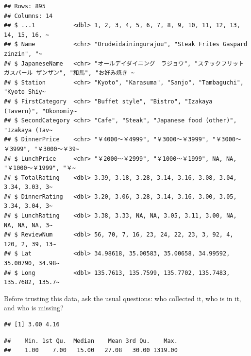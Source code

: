 \documentclass[
]{article}
\newenvironment{Shaded}{\begin{snugshade}}{\end{snugshade}}
\newcommand{\CommentTok}[1]{\textcolor[rgb]{0.56,0.35,0.01}{\textit{#1}}}
\newcommand{\FunctionTok}[1]{\textcolor[rgb]{0.13,0.29,0.53}{\textbf{#1}}}
\newcommand{\NormalTok}[1]{#1}
\newcommand{\SpecialCharTok}[1]{\textcolor[rgb]{0.81,0.36,0.00}{\textbf{#1}}}
\begin{document}
\begin{verbatim}
## Rows: 895
## Columns: 14
## $ ...1           <dbl> 1, 2, 3, 4, 5, 6, 7, 8, 9, 10, 11, 12, 13, 14, 15, 16, ~
## $ Name           <chr> "Orudeidainingurajou", "Steak Frites Gaspard zinzin", "~
## $ JapaneseName   <chr> "オールデイダイニング　ラジョウ", "ステックフリット ガスパール ザンザン", "和馬", "お好み焼き ~
## $ Station        <chr> "Kyoto", "Karasuma", "Sanjo", "Tambaguchi", "Kyoto Shiy~
## $ FirstCategory  <chr> "Buffet style", "Bistro", "Izakaya (Tavern)", "Okonomiy~
## $ SecondCategory <chr> "Cafe", "Steak", "Japanese food (other)", "Izakaya (Tav~
## $ DinnerPrice    <chr> "￥4000～￥4999", "￥3000～￥3999", "￥3000～￥3999", "￥3000～￥39~
## $ LunchPrice     <chr> "￥2000～￥2999", "￥1000～￥1999", NA, NA, "￥1000～￥1999", "￥~
## $ TotalRating    <dbl> 3.39, 3.18, 3.28, 3.14, 3.16, 3.08, 3.04, 3.34, 3.03, 3~
## $ DinnerRating   <dbl> 3.20, 3.06, 3.28, 3.14, 3.16, 3.00, 3.05, 3.34, 3.04, 3~
## $ LunchRating    <dbl> 3.38, 3.33, NA, NA, 3.05, 3.11, 3.00, NA, NA, NA, NA, 3~
## $ ReviewNum      <dbl> 56, 70, 7, 16, 23, 24, 22, 23, 3, 92, 4, 120, 2, 39, 13~
## $ Lat            <dbl> 34.98618, 35.00583, 35.00658, 34.99592, 35.00790, 34.98~
## $ Long           <dbl> 135.7613, 135.7599, 135.7702, 135.7483, 135.7682, 135.7~
\end{verbatim}

Before trusting this data, ask the usual questions: who collected it,
who is in it, and who is missing?

\begin{Shaded}
\end{Shaded}

\begin{verbatim}
## [1] 3.00 4.16
\end{verbatim}

\begin{Shaded}
\end{Shaded}

\begin{verbatim}
##    Min. 1st Qu.  Median    Mean 3rd Qu.    Max. 
##    1.00    7.00   15.00   27.08   30.00 1319.00
\end{verbatim}
\end{document}
